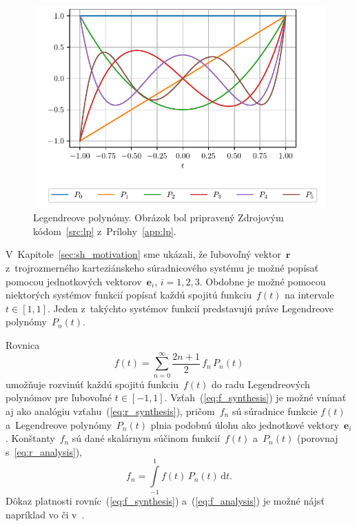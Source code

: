 \documentclass[a4paper,12pt]{book}
\newcommand{\diff}{\mathrm d}
\let\vec\mathbf
\begin{document}
\begin{figure}[bt]
\centering
\includegraphics{./fig-legendre-polynomials.pdf}
\caption{Legendreove polynómy.  Obrázok bol pripravený Zdrojovým
kódom~\ref{src:lp} z~Prílohy~\ref{app:lp}.}
\label{fig:lp}
\end{figure}

V~Kapitole~\ref{sec:sh_motivation} sme ukázali, že ľubovoľný vektor~$\vec r$
z~trojrozmerného karteziánskeho súradnicového systému je možné popísať pomocou
jednotkových vektorov~$\vec e_i$, $i = 1, 2, 3$.  Obdobne je možné pomocou
niektorých systémov funkcií popísať každú spojitú funkciu~$f(t)$ na intervale
$t \in [1, 1]$.  Jeden z~takýchto systémov funkcií predstavujú práve
Legendreove polynómy~$P_n(t)$.

Rovnica
%
\begin{equation}
\label{eq:f_synthesis}
f(t) = \sum_{n = 0}^\infty \frac{2n + 1}{2} \, f_n \, P_n(t)
\end{equation}
%
umožňuje rozvinúť každú spojitú funkciu~$f(t)$ do radu Legendreových polynómov
pre ľubovoľné $t \in [-1, 1]$.  Vzťah~(\ref{eq:f_synthesis}) je možné vnímať aj
ako analógiu vzťahu~(\ref{eq:r_synthesis}), pričom~$f_n$ sú súradnice funkcie
$f(t)$ a~Legendreove polynómy~$P_n(t)$ plnia podobnú úlohu ako jednotkové
vektory~$\vec e_i$.  Konštanty~$f_n$ sú dané skalárnym súčinom funkcií~$f(t)$
a~$P_n(t)$ (porovnaj s~\ref{eq:r_analysis}),
%
\begin{equation}
\label{eq:f_analysis}
f_n = \int\limits_{-1}^1 f(t) \, P_n(t) \, \diff t{.}
\end{equation}
%
Dôkaz platnosti rovníc~(\ref{eq:f_synthesis}) a~(\ref{eq:f_analysis}) je možné 
nájsť napríklad vo \textcite{Freeden2009} či 
v~\textcite{SansoGeoidDetermination}.
\end{document}
